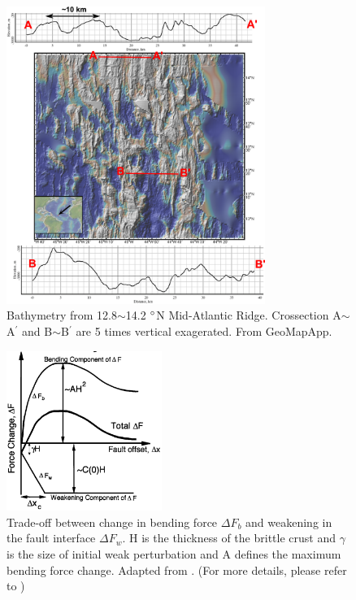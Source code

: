 \documentclass[draft,gc]{agutex}
\begin{document}
\begin{figure}[h]
\noindent\includegraphics[width=0.75\textwidth]{./Figures/fig_Discussion_Observation_2_13-14N_MAR.eps}
 \caption[Bathymetry from 12.8$\sim$14.2 $\degree$N Mid-Atlantic Ridge.]{Bathymetry from 12.8$\sim$14.2 $\degree$N Mid-Atlantic Ridge. Crossection A$\sim$A$^{\prime}$ and B$\sim$B$^{\prime}$ are 5 times vertical exagerated. From GeoMapApp.}
 \label{fig_Discussion_Observation_2_13-14N_MAR}
\end{figure}

\begin{figure}[h]
\noindent\includegraphics[width=0.45\textwidth]{./Figures/fig_Results_Weakening_1_tradeOff_bend_weak.png}
 \caption[Trade-off between change in bending force $\Delta F_{b}$ and weakening in the fault interface $\Delta F_{w}$. Adapted from \citep{Lavier2000}.]{Trade-off between change in bending force $\Delta F_{b}$ and weakening in the fault interface $\Delta F_{w}$. H is the thickness of the brittle crust and $\gamma$ is the size of initial weak perturbation and A defines the maximum bending force change. Adapted from \citep{Lavier2000}. (For more details, please refer to \citep{Lavier2000})}
 \label{fig_Results_Weakening_1}
\end{figure}
\end{document}
